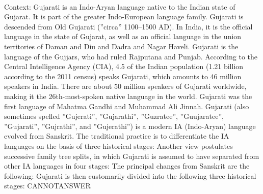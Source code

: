 \documentclass[11pt,a4paper, onecolumn]{article}
\begin{document}
\\ Context: Gujarati is an Indo-Aryan language native to the Indian state of Gujarat. It is part of the greater Indo-European language family. Gujarati is descended from Old Gujarati (''circa'' 1100–1500 AD). In India, it is the official language in the state of Gujarat, as well as an official language in the union territories of Daman and Diu and Dadra and Nagar Haveli. Gujarati is the language of the Gujjars, who had ruled Rajputana and Punjab. According to the Central Intelligence Agency (CIA), 4.5  of the Indian population (1.21 billion according to the 2011 census) speaks Gujarati, which amounts to 46 million speakers in India. There are about 50 million speakers of Gujarati worldwide, making it the 26th-most-spoken native language in the world. Gujarati was the first language of Mahatma Gandhi and Muhammad Ali Jinnah. Gujarati (also sometimes spelled ''Gujerati'', ''Gujarathi'', ''Guzratee'', ''Guujaratee'', ''Gujarati'', ''Gujrathi'', and ''Gujerathi'') is a modern IA (Indo-Aryan) language evolved from Sanskrit. The traditional practice is to differentiate the IA languages on the basis of three historical stages: Another view postulates successive family tree splits, in which Gujarati is assumed to have separated from other IA languages in four stages: The principal changes from Sanskrit are the following: Gujarati is then customarily divided into the following three historical stages: CANNOTANSWER
\end{document}
